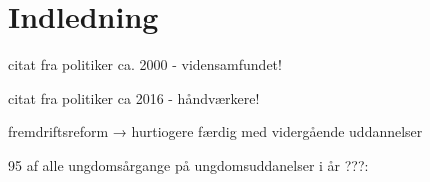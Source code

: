 \section{Indledning}

citat fra politiker ca. 2000 - vidensamfundet!

citat fra politiker ca 2016 - håndværkere!

fremdriftsreform → hurtiogere færdig med vidergående uddannelser

95 \perc af alle ungdomsårgange på ungdomsuddanelser i år ???:
